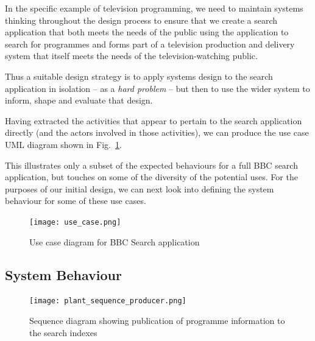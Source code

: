 \documentclass[oribibl]{llncs}
\begin{document}
In the specific example of television programming, we need to maintain
systems thinking throughout the design process to ensure that we
create a search application that both meets the needs of the public
using the application to search for programmes and forms part of
a television production and delivery system that itself meets the
needs of the television-watching public.

Thus a suitable design strategy is to apply systems design to
the search application in isolation -- as a \emph{hard problem} --
but then to use the wider system to inform, shape and evaluate that design.

Having extracted the activities that appear to pertain to the
search application directly (and the actors involved in those activities),
we can produce the use case UML diagram shown in Fig.~\ref{use-case}.

This illustrates only a subset of the expected behaviours for a full
BBC search application, but touches on some of the diversity of the
potential uses. For the purposes of our initial design, we can next look
into defining the system behaviour for some of these use cases.

\begin{figure}
  \begin{center}
    \texttt{[image: use\_case.png]}
  \end{center}
  \caption{Use case diagram for BBC Search application\label{use-case}}
\end{figure}

\subsection{System Behaviour}

\begin{figure}[t]
  \begin{center}
    \texttt{[image: plant\_sequence\_producer.png]}
  \end{center}
  \caption{Sequence diagram showing publication of programme information to the search indexes\label{sequence-producer}}
\end{figure}
\end{document}
